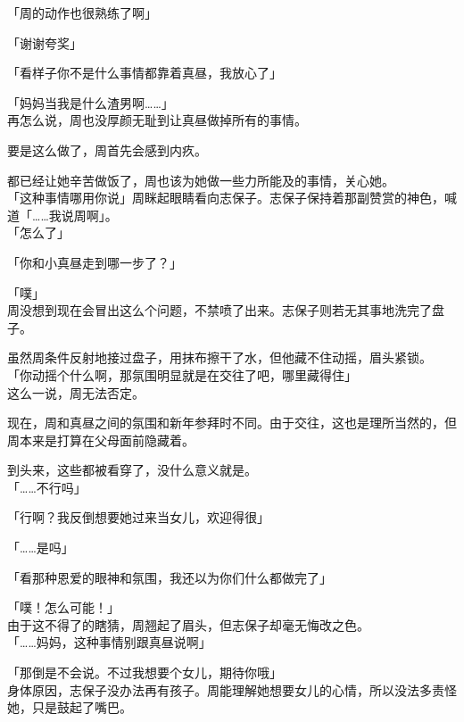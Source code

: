 「周的动作也很熟练了啊」

「谢谢夸奖」

「看样子你不是什么事情都靠着真昼，我放心了」

「妈妈当我是什么渣男啊……」\\

再怎么说，周也没厚颜无耻到让真昼做掉所有的事情。

要是这么做了，周首先会感到内疚。

都已经让她辛苦做饭了，周也该为她做一些力所能及的事情，关心她。\\

「这种事情哪用你说」周眯起眼睛看向志保子。志保子保持着那副赞赏的神色，喊道「……我说周啊」。\\

「怎么了」

「你和小真昼走到哪一步了？」

「噗」\\

周没想到现在会冒出这么个问题，不禁喷了出来。志保子则若无其事地洗完了盘子。

虽然周条件反射地接过盘子，用抹布擦干了水，但他藏不住动摇，眉头紧锁。\\

「你动摇个什么啊，那氛围明显就是在交往了吧，哪里藏得住」\\

这么一说，周无法否定。

现在，周和真昼之间的氛围和新年参拜时不同。由于交往，这也是理所当然的，但周本来是打算在父母面前隐藏着。

到头来，这些都被看穿了，没什么意义就是。\\

「……不行吗」

「行啊？我反倒想要她过来当女儿，欢迎得很」

「……是吗」

「看那种恩爱的眼神和氛围，我还以为你们什么都做完了」

「噗！怎么可能！」\\

由于这不得了的瞎猜，周翘起了眉头，但志保子却毫无悔改之色。\\

「……妈妈，这种事情别跟真昼说啊」

「那倒是不会说。不过我想要个女儿，期待你哦」\\

身体原因，志保子没办法再有孩子。周能理解她想要女儿的心情，所以没法多责怪她，只是鼓起了嘴巴。\\

